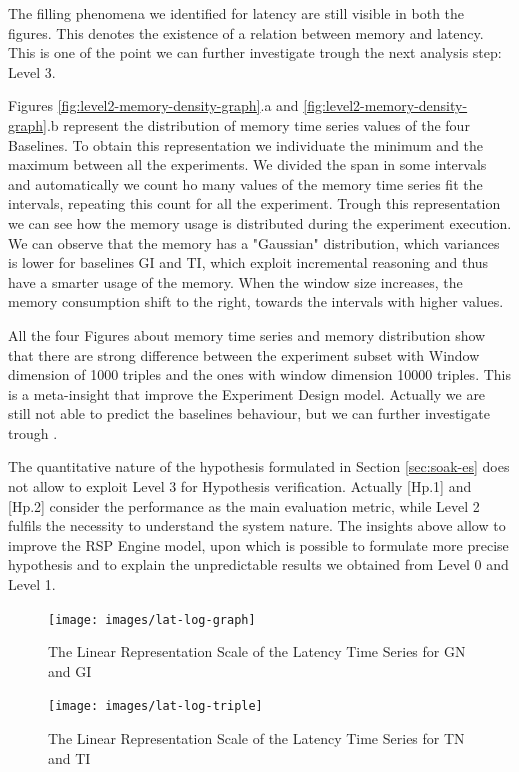 The filling phenomena we identified for latency are still visible in both the figures. This denotes the existence of a relation between memory and latency. This is one of the point we can further investigate trough the next analysis step: Level 3.

Figures \ref{fig:level2-memory-density-graph}.a and \ref{fig:level2-memory-density-graph}.b represent the distribution of memory time series values of the four Baselines. To obtain this representation we individuate the minimum and the maximum between all the experiments. We divided the span in some intervals and automatically we count ho many values of the memory time series fit the intervals, repeating this count for all the experiment. Trough this representation we can see how the memory usage is distributed during the experiment execution. We can observe that the memory has a "Gaussian" distribution, which variances is lower for baselines GI and TI, which exploit incremental reasoning and thus have a smarter usage of the memory. When the window size increases, the memory consumption shift to the right, towards the intervals with higher values.

All the four Figures about memory time series and memory distribution show that there are strong difference between the experiment subset with Window dimension of 1000  triples and the ones with window dimension 10000 triples. This is a meta-insight that improve the Experiment Design model. Actually we are still not able to predict the baselines behaviour, but we can further investigate trough \namens.

The quantitative nature of the hypothesis formulated in Section \ref{sec:soak-es} does not allow to exploit Level 3 for Hypothesis verification. Actually [Hp.1] and [Hp.2] consider the performance as the main evaluation metric, while Level 2 fulfils the necessity to understand the system nature. The insights above allow to improve the RSP Engine model, upon which is possible to formulate more precise hypothesis and to explain the unpredictable results we obtained from Level 0 and Level 1.

\begin{figure}[hbt]
  \centering
	\texttt{[image: images/lat-log-graph]}
	\caption{The Linear Representation Scale of the Latency Time Series for GN and GI} 
  	\label{fig:level2-latency-graph}
\end{figure}

\begin{figure}[hbt]
  \centering
	\texttt{[image: images/lat-log-triple]}
	\caption{The Linear Representation Scale of the Latency Time Series for TN and TI} 
  	\label{fig:level2-latency-triple}
\end{figure}


